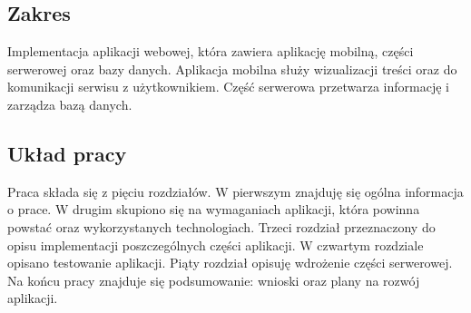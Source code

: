 \subsection{Zakres}
Implementacja aplikacji webowej, która zawiera aplikację mobilną, części serwerowej oraz bazy danych.
Aplikacja mobilna służy wizualizacji treści oraz do komunikacji serwisu z użytkownikiem.
Część serwerowa przetwarza informację i zarządza bazą danych.

\subsection{Układ pracy}
Praca składa się z pięciu rozdziałów. W pierwszym znajduję się ogólna informacja o prace.
W drugim skupiono się na wymaganiach aplikacji, która powinna powstać oraz wykorzystanych technologiach.
Trzeci rozdział przeznaczony do opisu implementacji poszczególnych części aplikacji.
W czwartym rozdziale opisano testowanie aplikacji.
Piąty rozdział opisuję wdrożenie części serwerowej.
Na końcu pracy znajduje się podsumowanie: wnioski oraz plany na rozwój aplikacji.